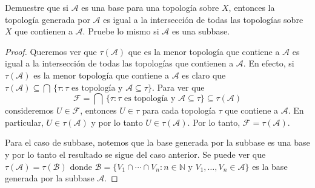 \documentclass{article}
\theoremstyle{definition}
\newcommand{\N}{\mathbb{N}}
\newenvironment{ejercicio}[1]{\begin{trivlist}
\item[\hskip \labelsep {\bfseries Ejercicio}\hskip \labelsep {\bfseries #1.}]}{\end{trivlist}}
\begin{document}
\begin{ejercicio}{11}
    Demuestre que si \(\mathcal{A}\) es una base para una topología sobre \(X\), entonces la topología generada por \(\mathcal{A}\) es igual a la intersección de todas las topologías sobre \(X\) que contienen a \(\mathcal{A}\). Pruebe lo mismo si \(\mathcal{A}\) es una subbase.
\end{ejercicio}
\begin{proof}
    Queremos ver que \( \tau(\mathcal{A}) \) que es la menor topología que contiene a \( \mathcal{A} \) es igual a la intersección de todas las topologías que contienen a \( \mathcal{A} \). En efecto, si \( \tau(\mathcal{A}) \) es la menor topología que contiene a \( \mathcal{A} \) es claro que \( \tau(\mathcal{A}) \subseteq \bigcap \, \{ \tau : \tau \text{ es topología y } \mathcal{A} \subseteq \tau \} \).
    Para ver que \[
        \mathcal{F} = \bigcap \, \{ \tau : \tau \text{ es topología y } \mathcal{A} \subseteq \tau \} \subseteq \tau(\mathcal{A})
    \]
    consideremos \( U \in \mathcal{F} \), entonces \( U \in \tau \) para cada topología \( \tau \) que contiene a \( \mathcal{A} \). En particular, \( U \in \tau(\mathcal{A}) \) y por lo tanto \( U \in \tau(\mathcal{A}) \). Por lo tanto, \( \mathcal{F} = \tau(\mathcal{A}) \).

    Para el caso de subbase, notemos que la base generada por la subbase es una base y por lo tanto el resultado se sigue del caso anterior. Se puede ver que \( \tau(\mathcal{A}) = \tau(\mathcal{B}) \) donde \( \mathcal{B} = \{ V_1 \cap \cdots \cap V_n : n \in \N \text{ y } V_1, \ldots, V_n \in \mathcal{A} \} \) es la base generada por la subbase \( \mathcal{A} \).
\end{proof}

\clearpage
\end{document}
